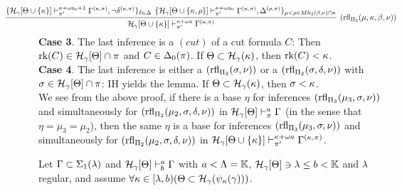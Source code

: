 \documentclass{article}
\newcommand{\mK}{\mathbb{K}}
\begin{document}
{\footnotesize
\[
\hspace{-15mm}
\infer[({\rm rfl}_{\Pi_{2}}(\mu,\kap,\bet,\nu))]{
\calh_{\gam}[\Tht\cup \{\kap\}]\vdash^{\kap+\ome a}_{\pi^{\prime}}\Gam^{(\kap,\pi)}}
{
\{
\mathcal{H}_{\gam}[\Tht\cup \{\kap\}]\vdash^{\kap+\ome a_{0}+1}_{\pi^{\prime}}\Gam^{(\kap,\pi)}, 
\lnot\del^{(\kap,\pi)}
\}_{\del\in\Del}
&
\hspace{-2mm}
\{
\mathcal{H}_{\gam}[\Tht\cup \{\kap,\rho\}]\vdash^{\kap+\ome a_{0}}_{\pi^{\prime}}\Gam^{(\kap,\pi)}, 
\Del^{(\rho,\pi)}\}_{\mu<\rho\in Mh_{2}(\bet,\nu)\cap \kap}
}
\]
}
\textbf{Case 3}. The last inference is a $(cut)$ of a cut formula $C$:
Then $\mbox{{\rm rk}}(C)\in{\cal H}_{\gamma}[\Theta]\cap\pi$ and $C\in\Delta_{0}(\pi)$.
If $\Theta\subset{\cal H}_{\gamma}(\kappa)$, then $\mbox{{\rm rk}}(C)<\kappa$.
\\
\textbf{Case 4}. The last inference is either a $({\rm rfl}_{\Pi_{3}}(\sigma,\nu))$ or a 
$({\rm rfl}_{\Pi_{2}}(\sigma,\delta,\nu))$ with $\sigma\in{\cal H}_{\gamma}[\Theta]\cap\pi$:
IH yields the lemma.
If $\Theta\subset{\cal H}_{\gamma}(\kappa)$, then $\sigma<\kappa$.
\eprf
\\

We see from the above proof,
if there is a base $\eta$ for inferences $({\rm rfl}_{\Pi_{3}}(\mu_{3},\sigma,\nu))$ and simultaneously for 
$({\rm rfl}_{\Pi_{2}}(\mu_{2},\sigma,\delta,\nu))$ in ${\cal H}_{\gamma}[\Theta]\vdash^{a}_{\pi}\Gamma$
(in the sense that
$\eta=\mu_{3}=\mu_{2}$),
then the same $\eta$ is a base for
inferences $({\rm rfl}_{\Pi_{3}}(\mu_{3},\sigma,\nu))$ and simultaneously for 
$({\rm rfl}_{\Pi_{2}}(\mu_{2},\sigma,\delta,\nu))$ in
${\cal H}_{\gamma}[\Theta\cup \{\kappa\}]\vdash^{\kappa+\omega a}_{\pi^{\prime}}\Gamma^{(\kappa,\pi)}$.


\blem\label{lem:lowerPi24}
Let $\Gamma\subset\Sigma_{1}(\lambda)$ and
${\cal H}_{\gamma}[\Theta]\vdash^{a}_{b}\Gamma$ with $a<\Lam=\mK$,
$\calh_{\gam}[\Tht]\ni\lam\leq b<\mK$ and
$\lambda$ regular, and assume
$\forall\kappa\in[\lambda,b)(\Theta\subset{\cal H}_{\gamma}(\psi_{\kappa}(\gamma)))$.
\end{document}
